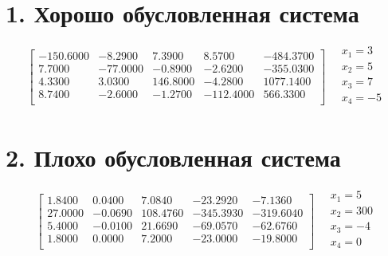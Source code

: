 \documentclass[12pt, a4paper]{article}
\begin{document}
\section*{1. Хорошо обусловленная система}

\begin{equation*}
\left[
\begin{array}{cccc|c}
 -150.6000 &  -8.2900 &   7.3900 &   8.5700 & -484.3700 \\
    7.7000 & -77.0000 &  -0.8900 &  -2.6200 & -355.0300 \\
    4.3300 &   3.0300 & 146.8000 &  -4.2800 & 1077.1400 \\
    8.7400 &  -2.6000 &  -1.2700 &-112.4000 &  566.3300 \\
\end{array}
\right]
\quad
\begin{array}{c}
x_1 = 3 \\
x_2 = 5 \\
x_3 = 7 \\
x_4 = -5 \\
\end{array}
\end{equation*}

\section*{2. Плохо обусловленная система}

\begin{equation*}
\left[
\begin{array}{cccc|c}
    1.8400 &  0.0400 &   7.0840 & -23.2920 &   -7.1360 \\
   27.0000 & -0.0690 & 108.4760 &-345.3930 & -319.6040 \\
    5.4000 & -0.0100 &  21.6690 & -69.0570 &  -62.6760 \\
    1.8000 &  0.0000 &   7.2000 & -23.0000 &  -19.8000 \\
\end{array}
\right]
\quad
\begin{array}{c}
x_1 = 5 \\
x_2 = 300 \\
x_3 = -4 \\
x_4 = 0 \\

\end{array}
\end{equation*}
\end{document}
